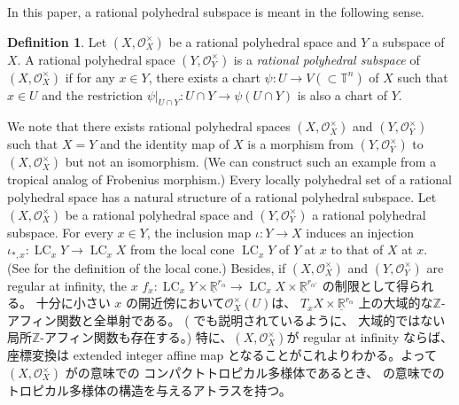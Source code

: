 \documentclass[a4paper,dvipdfmx,reqno,12pt]{amsart}
\theoremstyle{definition}
\newtheorem{definition}[theorem]{Definition}
\newcommand{\opn}[1]{\operatorname{#1}}
\numberwithin{equation}{section}
\begin{document}
In this paper, a rational polyhedral subspace is meant
in the following sense.

\begin{definition}
Let 
$(X,\mathcal{O}_X^{\times})$ be a rational polyhedral space
and $Y$ a subspace of $X$.
A rational polyhedral space $(Y,\mathcal{O}_Y^{\times})$ is 
a \emph{rational polyhedral subspace} of
$(X,\mathcal{O}_X^{\times})$ if 
for any $x\in Y$, there exists a chart
$\psi \colon U \to V (\subset \mathbb{T}^{n})$
of $X$
such that $x\in U$ and the restriction
$\psi|_{U\cap Y}\colon U\cap Y\to 
\psi(U\cap Y)$ is also a chart of $Y$.
\end{definition}
We note that there exists rational polyhedral spaces
$(X,\mathcal{O}_X^{\times})$
and $(Y,\mathcal{O}_Y^{\times})$
such that $X=Y$ and the identity map of $X$ 
is a morphism from $(Y,\mathcal{O}_Y^{\times})$ to
$(X,\mathcal{O}_X^{\times})$ but not an isomorphism.
(We can construct such an example from a tropical analog of
Frobenius morphism.)
Every locally polyhedral set of a rational polyhedral space
\cite[Definition 2.4 (d)]{MR4637248} has a natural 
structure of a rational polyhedral subspace.
Let $(X,\mathcal{O}_X^{\times})$ be a rational
polyhedral space and $(Y,\mathcal{O}_Y^{\times})$
a rational polyhedral subspace.
For every $x\in Y$, 
the inclusion map $\iota\colon Y\to X$ induces
an injection 
$\iota_{*,x}\colon \opn{LC}_x Y\to \opn{LC}_x X$
from the local cone $\opn{LC}_x Y$ of $Y$ at $x$ to 
that of $X$ at $x$.
(See \cite[]{MR4637248} for
the definition of the local cone.)
Besides, if
$(X,\mathcal{O}_X^{\times})$ and
$(Y,\mathcal{O}_Y^{\times})$ are
regular at infinity, 
the $x$
$f_{x}\colon \opn{LC}_x Y\times 
\underline{\mathbb{R}}^{r_{\alpha}}
\to \opn{LC}_x X\times \underline{\mathbb{R}}^{r_{\alpha'}}$
の制限として得られる。
十分に小さい $x$
の開近傍において$\mathcal{O}_X^{\times}(U)$は、
$T_x X\times \underline{\mathbb{R}}^{r_{\alpha}}$
上の大域的な$\mathbb{Z}$-アフィン関数と全単射である。
(\cite[Example 2.1]{MR4637248} でも説明されているように、
大域的ではない局所$\mathbb{Z}$-アフィン関数も存在する。)
特に、$(X,\mathcal{O}_X^{\times})$が regular at infinity
ならば、座標変換は
extended integer affine map \cite[Definition 2.2]{demedrano2023chern}
となることがこれよりわかる。よって
$(X,\mathcal{O}_X^{\times})$ 
が\cite[Definition 6.1]{gross2019sheaftheoretic}の意味での
コンパクトトロピカル多様体であるとき、
\cite[Definition 2.3]{demedrano2023chern}
の意味でのトロピカル多様体の構造を与えるアトラスを持つ。
\end{document}
